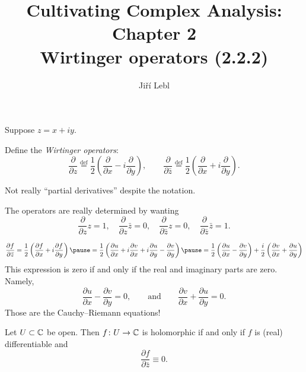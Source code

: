 \documentclass[10pt,aspectratio=169]{beamer}
\author{Ji\v{r}\'i Lebl}
\institute[OSU]{%
Departemento pri Matematiko de Oklahoma {\^S}tata Universitato}
\title{Cultivating Complex Analysis: Chapter 2\\%
Wirtinger operators (2.2.2)}
\date{}
\begin{document}
\begin{frame}
\titlepage
\end{frame}

\begin{frame}
Suppose $z=x+iy$.

\medskip
\pause

Define
the \emph{Wirtinger operators}:
\[
\frac{\partial}{\partial z}
\overset{\text{def}}{=}
\frac{1}{2}
\left(
\frac{\partial}{\partial x} - i
\frac{\partial}{\partial y}
\right),
\qquad
\frac{\partial}{\partial \bar{z}}
\overset{\text{def}}{=}
\frac{1}{2}
\left(
\frac{\partial}{\partial x} + i
\frac{\partial}{\partial y}
\right) .
\]

\pause

Not really ``partial derivatives'' despite the notation.

\medskip
\pause

The operators are really determined by wanting
\[
\frac{\partial}{\partial z} z = 1, \quad
\frac{\partial}{\partial z} \bar{z} = 0, \quad
\frac{\partial}{\partial \bar{z}} z = 0, \quad
\frac{\partial}{\partial \bar{z}} \bar{z} = 1.
\]
\end{frame}

\begin{frame}
\[
\frac{\partial f}{\partial \bar{z}} 
=
\frac{1}{2}
\left(
\frac{\partial f}{\partial x} + i
\frac{\partial f}{\partial y}
\right)
\pause
=
\frac{1}{2}
\left(
\frac{\partial u}{\partial x} 
+ i \frac{\partial v}{\partial x} 
+ i \frac{\partial u}{\partial y}
- \frac{\partial v}{\partial y}
\right) 
\pause
=
\frac{1}{2}
\left(
\frac{\partial u}{\partial x} 
- \frac{\partial v}{\partial y}
\right)
+
\frac{i}{2}
\left(
\frac{\partial v}{\partial x} 
+ \frac{\partial u}{\partial y}
\right)
\]
\pause
This expression is zero if and only if the real and imaginary
parts are zero. \pause  Namely,
\[
\frac{\partial u}{\partial x} 
- \frac{\partial v}{\partial y}
= 0,
\qquad
\text{and}
\qquad
\frac{\partial v}{\partial x} 
+ \frac{\partial u}{\partial y} = 0
.
\]
\pause
Those are the Cauchy--Riemann equations!

\pause

\begin{proposition}
Let $U \subset {\mathbb{C}}$ be open.  Then $f \colon U \to {\mathbb{C}}$ is
holomorphic if and only if
$f$ is (real) differentiable and
\begin{equation*}
\frac{\partial f}{\partial \bar{z}} \equiv 0 .
\end{equation*}
\end{proposition}
\end{frame}
\end{document}
